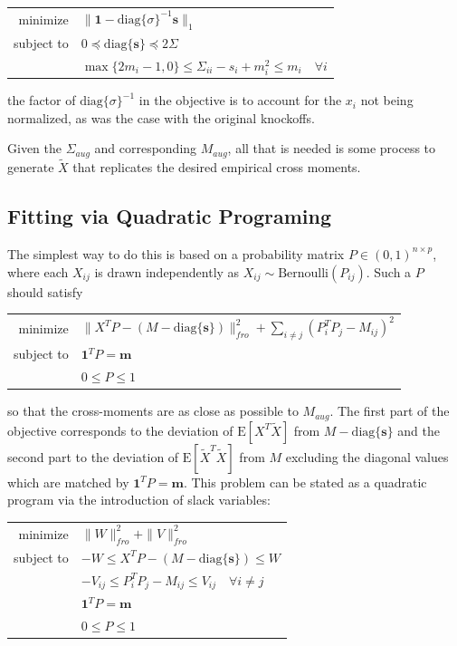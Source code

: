 \documentclass[11pt]{article}
\newcommand{\E}{\mathrm{E}}
\newcommand{\diag}[1]{\mathrm{diag}\{#1\}}
\theoremstyle{definition}
\begin{document}
            \begin{center}
                \begin{tabular}{r l}
                    minimize & $\|\mathbf 1-\diag{\sigma}^{-1}\mathbf s\|_1$ \\
                    subject to & $ 0 \preceq \diag{\mathbf s} \preceq 2\Sigma $ \\
                               & $ \max\{2m_i -1,0\} \leq \Sigma_{ii}-s_i + m_i^2 \leq m_i  \quad \forall i$
                \end{tabular} 
            \end{center} 
            the factor of $\diag{\sigma}^{-1}$ in the objective is to account for the $x_i$ not being normalized, as was the case with the original knockoffs. \par
            Given the $\Sigma_{aug}$ and corresponding $M_{aug}$, all that is needed is some process to generate $\tilde X$ that replicates the desired empirical cross moments. 


\subsection{Fitting via Quadratic Programing}
        The simplest way to do this is based on a probability matrix $P\in (0,1)^{n\times p}$, where each $X_{ij}$ is drawn independently as $X_{ij}\sim\textrm{Bernoulli}(P_{ij})$. Such a $P$ should satisfy 
            \begin{center}
                \begin{tabular}{r l}
                    minimize     & $\|X^TP-(M-\diag{\mathbf{s}})\|_{fro}^2 + \sum_{i\neq j}(P_i^T P_j - M_{ij})^2 $\\
                    subject to   & $ \mathbf 1^T P = \mathbf m $ \\
                                 & $0 \leq P \leq 1$
                \end{tabular} 
            \end{center}
            so that the cross-moments are as close as possible to $M_{aug}$. The first part of the objective corresponds to the deviation of $\E[X^T\tilde X]$ from $M-\diag{\mathbf{s}}$ and the second part to the deviation of $\E[\tilde X^T \tilde X]$ from $M$ excluding the diagonal values which are matched by $ \mathbf 1^T P = \mathbf m $. This problem can be stated as a quadratic program via the introduction of slack variables:
            \begin{center}
                \begin{tabular}{r l}
                    minimize     & $\|W\|_{fro}^2 + \|V\|_{fro}^2 $ \\
                    subject to   & $ -W \leq X^TP-(M-\diag{\mathbf{s}})\leq W $ \\
                                 & $ -V_{ij} \leq P_i^T P_j - M_{ij} \leq V_{ij} \quad \forall i\neq j$ \\
                                 & $ \mathbf 1^T P = \mathbf m $ \\
                                 & $0 \leq P \leq 1$
                \end{tabular} 
            \end{center}
\end{document}
